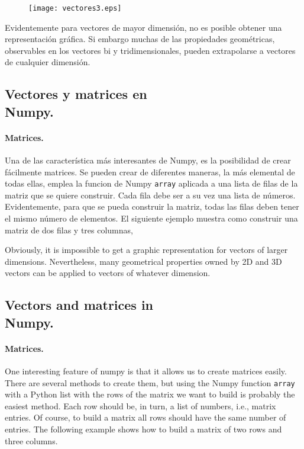 \begin{figure}[h]
\centering
\texttt{[image: vectores3.eps]}
\label{fig:vectores3}
\end{figure}
\begin{paracol}{2}
Evidentemente para vectores de mayor dimensión, no es posible obtener una representación gráfica. Si embargo muchas de las propiedades geométricas, observables en los vectores bi y tridimensionales, pueden extrapolarse a vectores de cualquier dimensión.

\subsection{Vectores y matrices en\\ Numpy.}   
\paragraph{Matrices.} Una de las característica más interesantes de Numpy, es la posibilidad de crear fácilmente matrices. Se pueden crear de diferentes maneras, la más elemental de todas ellas, emplea la funcion de Numpy \texttt{array} aplicada a una lista de filas de la matriz que se quiere construir. Cada fila debe ser a su vez una lista de números. Evidentemente, para que se pueda construir la matriz, todas las filas deben tener el mismo número de elementos. El siguiente ejemplo muestra como construir una matriz de dos filas y tres columnas,

\switchcolumn 
Obviously, it is impossible to get a graphic representation for vectors of larger dimensions. Nevertheless, many geometrical properties owned by 2D and 3D vectors can be applied to vectors of whatever dimension.

\subsection{Vectors and matrices in\\ Numpy.}
\paragraph{Matrices.} One interesting feature of numpy is that it allows us to create matrices easily. There are several methods to create them, but using the Numpy function \texttt{array} with a Python list with the rows of the matrix we want to build is probably the easiest method. Each row should be, in turn, a list of numbers, i.e., matrix entries. Of course, to build a matrix all rows should have the same number of entries. The following example shows how to build a matrix of two rows and three columns.
\end{paracol}

